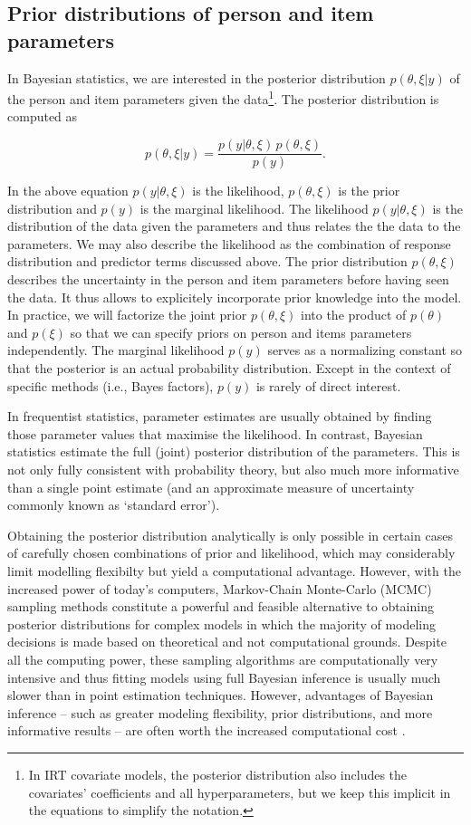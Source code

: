 \documentclass[jss]{jss}
\begin{document}
\hypertarget{priors}{%
\subsection{Prior distributions of person and item
parameters}\label{priors}}

In Bayesian statistics, we are interested in the posterior distribution
\(p(\theta, \xi | y)\) of the person and item parameters given the
data\footnote{In IRT covariate models, the posterior distribution also includes
the covariates' coefficients and all hyperparameters, but we keep this implicit
in the equations to simplify the notation.}. The posterior distribution
is computed as

\[
p(\theta, \xi | y) = \frac{p(y | \theta, \xi) \, p(\theta, \xi)}{p(y)}.
\]

In the above equation \(p(y | \theta, \xi)\) is the likelihood,
\(p(\theta, \xi)\) is the prior distribution and \(p(y)\) is the
marginal likelihood. The likelihood \(p(y | \theta, \xi)\) is the
distribution of the data given the parameters and thus relates the the
data to the parameters. We may also describe the likelihood as the
combination of response distribution and predictor terms discussed
above. The prior distribution \(p(\theta, \xi)\) describes the
uncertainty in the person and item parameters before having seen the
data. It thus allows to explicitely incorporate prior knowledge into the
model. In practice, we will factorize the joint prior \(p(\theta, \xi)\)
into the product of \(p(\theta)\) and \(p(\xi)\) so that we can specify
priors on person and items parameters independently. The marginal
likelihood \(p(y)\) serves as a normalizing constant so that the
posterior is an actual probability distribution. Except in the context
of specific methods (i.e., Bayes factors), \(p(y)\) is rarely of direct
interest.

In frequentist statistics, parameter estimates are usually obtained by
finding those parameter values that maximise the likelihood. In
contrast, Bayesian statistics estimate the full (joint) posterior
distribution of the parameters. This is not only fully consistent with
probability theory, but also much more informative than a single point
estimate (and an approximate measure of uncertainty commonly known as
`standard error').

Obtaining the posterior distribution analytically is only possible in
certain cases of carefully chosen combinations of prior and likelihood,
which may considerably limit modelling flexibilty but yield a
computational advantage. However, with the increased power of today's
computers, Markov-Chain Monte-Carlo (MCMC) sampling methods constitute a
powerful and feasible alternative to obtaining posterior distributions
for complex models in which the majority of modeling decisions is made
based on theoretical and not computational grounds. Despite all the
computing power, these sampling algorithms are computationally very
intensive and thus fitting models using full Bayesian inference is
usually much slower than in point estimation techniques. However,
advantages of Bayesian inference -- such as greater modeling
flexibility, prior distributions, and more informative results -- are
often worth the increased computational cost \citep{gelman2014}.
\end{document}
